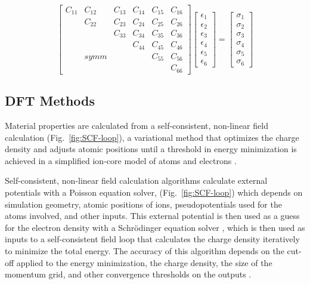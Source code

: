 \documentclass[final,3p,times]{elsarticle}
\begin{document}
\begin{equation} \label{eqn:stiffness-voigt-notation}
 \begin{bmatrix}
C_{11} & C_{12} & C_{13} & C_{14} & C_{15} & C_{16} \\
 & C_{22} & C_{23} & C_{24} & C_{25} & C_{26} \\
 &  & C_{33} & C_{34} & C_{35} & C_{36} \\
 &  &  & C_{44} & C_{45} & C_{46} \\
 & symm &  &  & C_{55} & C_{56} \\
 &  &  &  &  & C_{66}
\end{bmatrix}  \begin{bmatrix}
\epsilon_{1} \\
\epsilon_{2} \\
\epsilon_{3} \\
\epsilon_{4} \\
\epsilon_{5} \\
\epsilon_{6}
\end{bmatrix}  =  \begin{bmatrix}
\sigma_{1} \\
\sigma_{2} \\
\sigma_{3} \\
\sigma_{4} \\
\sigma_{5} \\
\sigma_{6}
\end{bmatrix}
\end{equation}


\subsection{DFT Methods}
Material properties are calculated from a self-consistent, non-linear field calculation (Fig.~\ref{fig:SCF-loop}), a variational method that optimizes the charge density and adjusts atomic positions until a threshold in energy minimization is achieved in a simplified ion-core model of atoms and electrons \cite{Schwingenschloegl2004}.

Self-consistent, non-linear field calculation algorithms calculate external potentials with a Poisson equation solver, (Fig.~\ref{fig:SCF-loop}) which depends on simulation geometry, atomic positions of ions, pseudopotentials used for the atoms involved, and other inputs. This external potential is then used as a guess for the electron density with a Schr\"{o}dinger equation solver \cite{giustino2014materials}, which is then used as inputs to a self-consistent field loop that calculates the charge density iteratively to minimize the total energy. The accuracy of this algorithm depends on the cut-off applied to the energy minimization, the charge density, the size of the momentum grid, and other convergence thresholds on the outputs \cite{hung2022quantum, Schwingenschloegl2004, giustino2014materials}.
\end{document}
